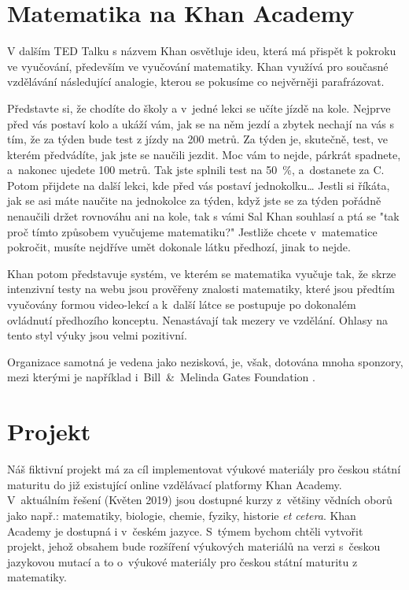 \documentclass[12pt, a4paper]{report}
\begin{document}
\section{Matematika na Khan Academy}
\label{sec:org6ff349a}
V dalším TED Talku s názvem  Khan osvětluje ideu, která má
přispět k pokroku ve vyučování, především ve vyučování matematiky. Khan využívá
pro současné vzdělávání následující analogie, kterou se pokusíme co nejvěrněji
parafrázovat.

Představte si, že chodíte do školy a v jedné lekci se učíte jízdě na kole.
Nejprve před vás postaví kolo a ukáží vám, jak se na něm jezdí a zbytek nechají
na vás s tím, že za týden bude test z jízdy na 200 metrů. Za týden je, skutečně,
test, ve kterém předvádíte, jak jste se naučili jezdit. Moc vám to nejde,
párkrát spadnete, a nakonec ujedete 100 metrů. Tak jste splnili test na 50 \%,
a dostanete za C. Potom přijdete na další lekci, kde před vás postaví
jednokolku\ldots{} Jestli si říkáta, jak se asi máte naučite na jednokolce za týden,
když jste se za týden pořádně nenaučili držet rovnováhu ani na kole, tak s vámi
Sal Khan souhlasí a ptá se "tak proč tímto způsobem vyučujeme matematiku?"
Jestliže chcete v matematice pokročit, musíte nejdříve umět dokonale látku
předhozí, jinak to nejde. \parencite{khan_ted_mastery}

Khan potom představuje systém, ve kterém se matematika vyučuje tak, že skrze
intenzivní testy na webu jsou prověřeny znalosti matematiky, které jsou předtím
vyučovány formou video-lekcí a k další látce se postupuje po dokonalém ovládnutí
předhozího konceptu. Nenastávají tak mezery ve vzdělání. Ohlasy na tento styl
výuky jsou velmi pozitivní.

Organizace samotná je vedena jako nezisková, je, však,
dotována mnoha sponzory, mezi kterými je například i Bill \& Melinda Gates
Foundation \parencite{khan_academy_supp}.


\section{Projekt}
\label{sec:org6c4e333}

Náš fiktivní projekt má za cíl implementovat výukové materiály pro českou
státní maturitu do již existující online vzdělávací platformy Khan Academy.
V aktuálním řešení (Květen 2019) jsou dostupné kurzy z většiny vědních oborů
jako např.: matematiky, biologie, chemie, fyziky, historie \emph{et cetera}. Khan
Academy je dostupná i v českém jazyce. S týmem bychom chtěli vytvořit projekt,
jehož obsahem bude rozšíření výukových materiálů na verzi s českou jazykovou
mutací a to o výukové materiály pro českou státní maturitu z matematiky.
\end{document}
